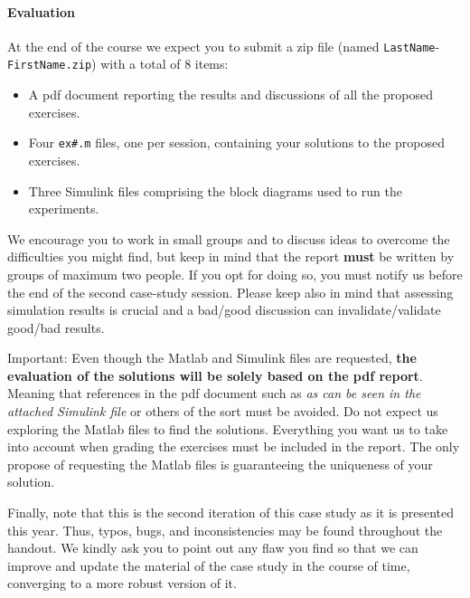 	\paragraph{Evaluation}
	At the end of the course we expect you to submit a zip file (named \texttt{LastName}-\texttt{FirstName.zip}) with a total of 8 items:
	\begin{itemize}
		\setlength\itemsep{0em}
		\item A pdf document reporting the results and discussions of all the proposed exercises. 
		\item Four \texttt{ex\#.m} files, one per session, containing your solutions to the proposed exercises. 
		\item Three Simulink files comprising the block diagrams used to run the experiments.
	\end{itemize}
	We encourage you to work in small groups and to discuss ideas to overcome the difficulties you might find, but keep in mind that the report \textbf{must} be written by groups of maximum two people.
	If you opt for doing so, you must notify us before the end of the second case-study session.
	Please keep also in mind that assessing simulation results is crucial and a bad/good discussion can invalidate/validate good/bad results. 	
	\par
	Important: Even though the Matlab and Simulink files are requested, \textbf{the evaluation of the solutions will be solely based on the pdf report}.
	Meaning that references in the pdf document such as \emph{as can be seen in the attached Simulink file} or others of the sort must be avoided. 
	Do not expect us exploring the Matlab files to find the solutions.
	Everything you want us to take into account when grading the exercises must be included in the report. 
	The only propose of requesting the Matlab files is guaranteeing the uniqueness of your solution.\par
	Finally, note that this is the second iteration of this case study as it is presented this year. 
	Thus, typos, bugs, and inconsistencies may be found throughout the handout.
	We kindly ask you to point out any flaw you find so that we can improve and update the material of the case study in the course of time, converging to a more robust version of it.

